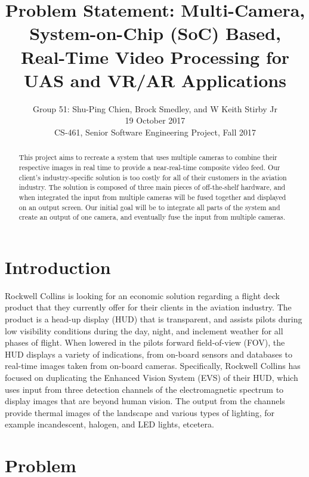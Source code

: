 \documentclass[letterpaper,10pt,serif,draftclsnofoot,onecolumn,compsoc,titlepage]{IEEEtran}
\title{Problem Statement: Multi-Camera, System-on-Chip (SoC) Based, Real-Time Video Processing for UAS and VR/AR Applications}
\author{Group 51: Shu-Ping Chien, Brock Smedley, and W Keith Stirby Jr \\ 19 October 2017 \\ CS-461, Senior Software Engineering Project, Fall 2017}
\begin{document}
\begin{titlepage}
\maketitle
\begin{abstract}

This project aims to recreate a system that uses multiple cameras to combine their 
respective images in real time to provide a near-real-time composite video feed. Our 
client’s industry-specific solution is too costly for all of their customers in the 
aviation industry. The solution is composed of three main pieces of off-the-shelf 
hardware, and when integrated the input from multiple cameras will be fused together 
and displayed on an output screen. Our initial goal will be to integrate all parts of 
the system and create an output of one camera, and eventually fuse the input from 
multiple cameras. \\

\end{abstract}
\end{titlepage}
\newpage


\section{Introduction}

Rockwell Collins is looking for an economic solution regarding a flight deck product 
that they currently offer for their clients in the aviation industry. The product is 
a head-up display (HUD) that is transparent, and assists pilots during low visibility 
conditions during the day, night, and inclement weather for all phases of flight. When 
lowered in the pilots forward field-of-view (FOV), the HUD displays a variety of 
indications, from on-board sensors and databases to real-time images taken from 
on-board cameras. Specifically, Rockwell Collins has focused on duplicating the 
Enhanced Vision System (EVS) of their HUD, which uses input from three detection 
channels of the electromagnetic spectrum to display images that are beyond human 
vision. The output from the channels provide thermal images of the landscape and 
various types of lighting, for example incandescent, halogen, and LED lights, 
etcetera. \\

\section{Problem}
\end{document}
